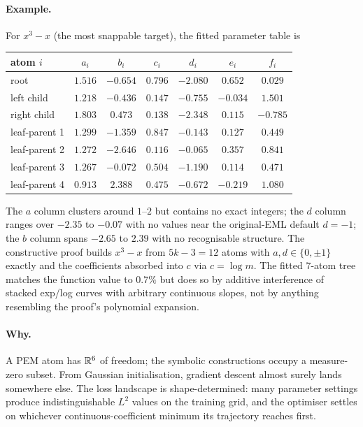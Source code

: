 \paragraph{Example.} For $x^3 - x$ (the most snappable target), the fitted
parameter table is
\begin{center}
\small
\begin{tabular}{l|cccccc}
\toprule
atom $i$ & $a_i$ & $b_i$ & $c_i$ & $d_i$ & $e_i$ & $f_i$ \\
\midrule
root            & $1.516$ & $-0.654$ & $0.796$ & $-2.080$ & $0.652$ & $0.029$ \\
left child      & $1.218$ & $-0.436$ & $0.147$ & $-0.755$ & $-0.034$ & $1.501$ \\
right child     & $1.803$ & $0.473$  & $0.138$ & $-2.348$ & $0.115$ & $-0.785$ \\
leaf-parent 1   & $1.299$ & $-1.359$ & $0.847$ & $-0.143$ & $0.127$ & $0.449$ \\
leaf-parent 2   & $1.272$ & $-2.646$ & $0.116$ & $-0.065$ & $0.357$ & $0.841$ \\
leaf-parent 3   & $1.267$ & $-0.072$ & $0.504$ & $-1.190$ & $0.114$ & $0.471$ \\
leaf-parent 4   & $0.913$ & $2.388$  & $0.475$ & $-0.672$ & $-0.219$ & $1.080$ \\
\bottomrule
\end{tabular}
\end{center}
The $a$ column clusters around $1$--$2$ but contains no exact integers; the
$d$ column ranges over $-2.35$ to $-0.07$ with no values near the
original-EML default $d = -1$; the $b$ column spans $-2.65$ to $2.39$ with
no recognisable structure. The constructive proof builds $x^3 - x$ from
$5k - 3 = 12$ atoms with $a, d \in \{0, \pm 1\}$ exactly and the
coefficients absorbed into $c$ via $c = \log m$. The fitted $7$-atom tree
matches the function value to $0.7\%$ but does so by additive interference
of stacked exp/log curves with arbitrary continuous slopes, not by
anything resembling the proof's polynomial expansion.

\paragraph{Why.} A PEM atom has $\mathbb R^6$ of freedom; the symbolic
constructions occupy a measure-zero subset. From Gaussian initialisation,
gradient descent almost surely lands somewhere else. The
loss landscape is shape-determined: many parameter settings produce
indistinguishable $L^2$ values on the training grid, and the
optimiser settles on whichever continuous-coefficient minimum its
trajectory reaches first.

